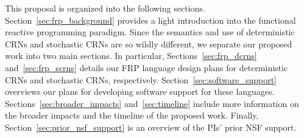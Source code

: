 This proposal is organized into the following sections.
Section~\ref{sec:frp_background} provides a light introduction into the functional reactive programming paradigm.
Since the semantics and use of deterministic CRNs and stochastic CRNs are so wildly different, we separate our proposed work into two main sections.
In particular, Sections~\ref{sec:frp_dcrns} and~\ref{sec:frp_scrns} details our FRP language design plans for deterministic CRNs and stochastic CRNs, respectively.
Section~\ref{sec:software_support} overviews our plans for developing software support for these languages.
Sections~\ref{sec:broader_impacts} and~\ref{sec:timeline} include more information on the broader impacts and the timeline of the proposed work.
Finally, Section~\ref{sec:prior_nsf_support} is an overview of the PIs' prior NSF support.



